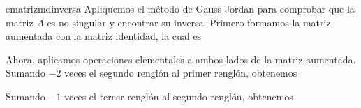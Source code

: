 \begin{examplebox}{}{ematrizmdinversa}
    \tcblower
    \solucion Apliquemos el método de Gauss-Jordan para comprobar que la matriz $A$ es no singular y encontrar su inversa. Primero formamos la matriz aumentada con la matriz identidad, la cual es
    \begin{matrizn}
    \end{matrizn}
    Ahora, aplicamos operaciones elementales a ambos lados de la matriz aumentada. Sumando $-2$ veces el segundo renglón al primer renglón, obtenemos
    \newpage
    \begin{matrizn}
    \end{matrizn}
    Sumando $-1$ veces el tercer renglón al segundo renglón, obtenemos
    \begin{matrizn}

\end{matrizn}
\end{examplebox}
